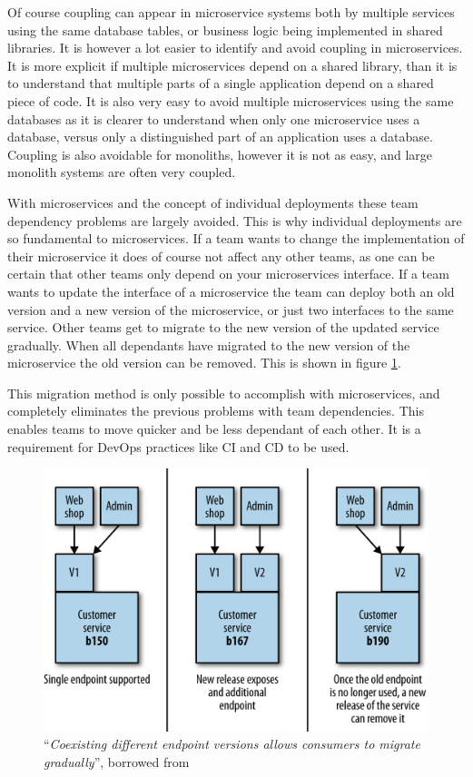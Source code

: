 \documentclass[a4paper]{article}
\begin{document}
Of course coupling can appear in microservice systems both by multiple services using the same database tables, or business logic being implemented in shared libraries. It is however a lot easier to identify and avoid coupling in microservices. It is more explicit if multiple microservices depend on a shared library, than it is to understand that multiple parts of a single application depend on a shared piece of code. It is also very easy to avoid multiple microservices using the same databases as it is clearer to understand when only one microservice uses a database, versus only a distinguished part of an application uses a database. Coupling is also avoidable for monoliths, however it is not as easy, and large monolith systems are often very coupled.

With microservices and the concept of individual deployments these team dependency problems are largely avoided. This is why individual deployments are so fundamental to microservices. If a team wants to change the implementation of their microservice it does of course not affect any other teams, as one can be certain that other teams only depend on your microservices interface. If a team wants to update the interface of a microservice the team can deploy both an old version and a new version of the microservice, or just two interfaces to the same service. Other teams get to migrate to the new version of the updated service gradually. When all dependants have migrated to the new version of the microservice the old version can be removed. This is shown in figure \ref{fig:microservice-versioning}.

This migration method is only possible to accomplish with microservices, and completely eliminates the previous problems with team dependencies. This enables teams to move quicker and be less dependant of each other. It is a requirement for DevOps practices like CI and CD to be used.

\begin{figure}[h]
    \centering
    \includegraphics[width=\textwidth]{microservice-versioning.png}
    \caption{``\textit{Coexisting different endpoint versions allows consumers to migrate gradually}'', borrowed from \cite{Newman2015}}
    \label{fig:microservice-versioning}
\end{figure}
\end{document}
